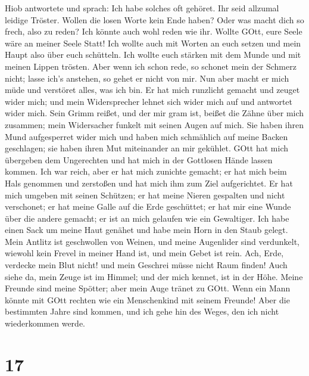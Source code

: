  Hiob antwortete und sprach:  Ich habe solches
oft gehöret. Ihr seid allzumal leidige Tröster.  Wollen die
losen Worte kein Ende haben? Oder was macht dich so frech, also zu
reden?  Ich könnte auch wohl reden wie ihr. Wollte GOtt,
eure Seele wäre an meiner Seele Statt! Ich wollte auch mit Worten an
euch setzen und mein Haupt also über euch schütteln.  Ich
wollte euch stärken mit dem Munde und mit meinen Lippen trösten.
 Aber wenn ich schon rede, so schonet mein der Schmerz
nicht; lasse ich's anstehen, so gehet er nicht von mir.  Nun
aber macht er mich müde und verstöret alles, was ich bin. 
Er hat mich runzlicht gemacht und zeuget wider mich; und mein
Widersprecher lehnet sich wider mich auf und antwortet wider mich.
 Sein Grimm reißet, und der mir gram ist, beißet die Zähne
über mich zusammen; mein Widersacher funkelt mit seinen Augen auf mich.
 Sie haben ihren Mund aufgesperret wider mich und haben
mich schmählich auf meine Backen geschlagen; sie haben ihren Mut
miteinander an mir gekühlet.  GOtt hat mich übergeben dem
Ungerechten und hat mich in der Gottlosen Hände lassen kommen.
 Ich war reich, aber er hat mich zunichte gemacht; er hat
mich beim Hals genommen und zerstoßen und hat mich ihm zum Ziel
aufgerichtet.  Er hat mich umgeben mit seinen Schützen; er
hat meine Nieren gespalten und nicht verschonet; er hat meine Galle auf
die Erde geschüttet;  er hat mir eine Wunde über die andere
gemacht; er ist an mich gelaufen wie ein Gewaltiger.  Ich
habe einen Sack um meine Haut genähet und habe mein Horn in den Staub
gelegt.  Mein Antlitz ist geschwollen von Weinen, und meine
Augenlider sind verdunkelt,  wiewohl kein Frevel in meiner
Hand ist, und mein Gebet ist rein.  Ach, Erde, verdecke
mein Blut nicht! und mein Geschrei müsse nicht Raum finden!
 Auch siehe da, mein Zeuge ist im Himmel; und der mich
kennet, ist in der Höhe.  Meine Freunde sind meine Spötter;
aber mein Auge tränet zu GOtt.  Wenn ein Mann könnte mit
GOtt rechten wie ein Menschenkind mit seinem Freunde!  Aber
die bestimmten Jahre sind kommen, und ich gehe hin des Weges, den ich
nicht wiederkommen werde.

\hypertarget{section-16}{%
\section{17}\label{section-16}}

